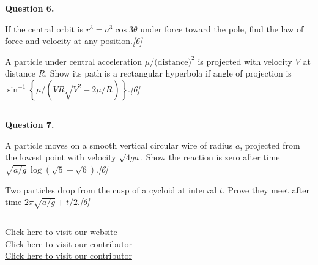\documentclass[11pt,a4paper]{article}
\newcommand{\pts}[1]{\hfill   \textit{[#1]}}
\begin{document}
\medskip


\noindent   \textbf{Question 6.}

\begin{parts}
  \item If the central orbit is $r^3=a^3\cos 3 \theta$ under force toward the pole, find the law of force and velocity at any position.\pts{6}
  \item A particle under central acceleration $\mu/ \text{(distance)}^2$ is projected with velocity $V$ at distance $R$. Show its path is a rectangular hyperbola if angle of projection is $\sin^{-1}\!\left\{\mu/(VR\sqrt{V^2-2\mu/R})\right\}$.\pts{6}
\end{parts}
\medskip\rule{\linewidth}{0.2pt}

\medskip


\noindent   \textbf{Question 7.}

\begin{parts}
  \item A particle moves on a smooth vertical circular wire of radius $a$, projected from the lowest point with velocity $\sqrt{4ga}$. Show the reaction is zero after time $\sqrt{a/g}\,\log(\sqrt{5}+\sqrt{6})$.\pts{6}
  \item Two particles drop from the cusp of a cycloid at interval $t$. Prove they meet after time $2\pi\sqrt{a/g}+t/2$.\pts{6}
\end{parts}

\vfill\rule{\linewidth}{0.4pt}

\begin{center}\small
\href{https://bhu-exam.vercel.app/}{Click here to visit our website}\\[4pt]
\href{https://me-aryan.vercel.app/}{Click here to visit our contributor}\\[4pt]
\href{https://quashan-me.vercel.app/}{Click here to visit our contributor}
\end{center}
\end{document}
